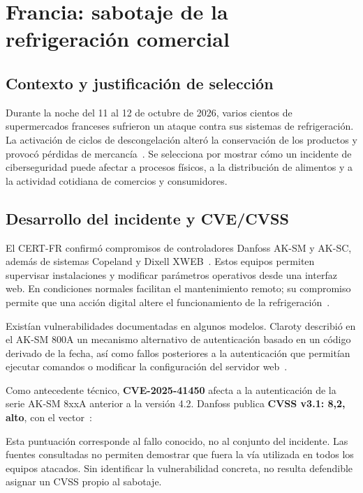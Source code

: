 \chapter{Francia: sabotaje de la refrigeración comercial}
\label{chap:incidente4}

\section{Contexto y justificación de selección}
Durante la noche del 11 al 12 de octubre de 2026,
varios cientos de supermercados franceses sufrieron
un ataque contra sus sistemas de refrigeración.
La activación de ciclos de descongelación alteró
la conservación de los productos y provocó pérdidas
de mercancía~\cite{onyphe2026francia}.
Se selecciona por mostrar cómo un incidente de
ciberseguridad puede afectar a procesos físicos,
a la distribución de alimentos y a la actividad
cotidiana de comercios y consumidores.

\section{Desarrollo del incidente y CVE/CVSS}
El CERT-FR confirmó compromisos de controladores
Danfoss AK-SM y AK-SC, además de sistemas Copeland
y Dixell XWEB~\cite{certfr2026frigorificos}.
Estos equipos permiten supervisar instalaciones y
modificar parámetros operativos desde una interfaz
web. En condiciones normales facilitan el mantenimiento
remoto; su compromiso permite que una acción digital
altere el funcionamiento de la
refrigeración~\cite{claroty2026danfoss}.

Existían vulnerabilidades documentadas en algunos
modelos. Claroty describió en el AK-SM 800A un mecanismo
alternativo de autenticación basado en un código
derivado de la fecha, así como fallos posteriores a
la autenticación que permitían ejecutar comandos
o modificar la configuración del servidor
web~\cite{claroty2026danfoss}.

Como antecedente técnico, \textbf{CVE-2025-41450}
afecta a la autenticación de la serie AK-SM 8xxA
anterior a la versión 4.2. Danfoss publica
\textbf{CVSS v3.1: 8,2, alto}, con el
vector~\cite{danfoss2025cve41450}:\par
{}\par
\noindent Esta puntuación corresponde al fallo conocido,
no al conjunto del incidente. Las fuentes consultadas
no permiten demostrar que fuera la vía utilizada
en todos los equipos atacados. Sin identificar
la vulnerabilidad concreta, no resulta defendible
asignar un CVSS propio al sabotaje.

